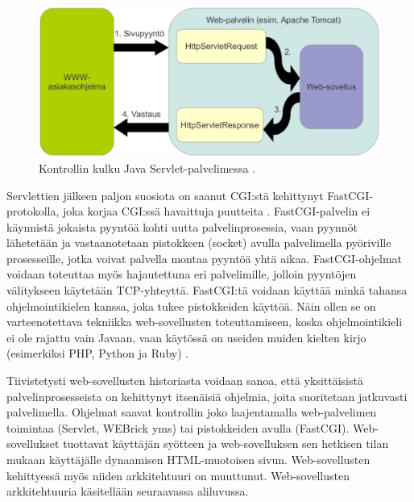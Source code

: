 \begin{figure}[ht]
\centering
\includegraphics[width=\textwidth]{web/servlet.eps}
\caption{Kontrollin kulku Java Servlet-palvelimessa \cite{j2ee}.}%
\label{servlet}
\end{figure}
\pagebreak
Servlettien jälkeen paljon suosiota on saanut CGI:stä kehittynyt FastCGI-protokolla, joka korjaa CGI:ssä havaittuja puutteita \cite{fastcgi}. FastCGI-palvelin ei käynnistä jokaista pyyntöä kohti uutta palvelinprosessia, vaan pyynnöt lähetetään ja vas\-taan\-o\-te\-taan pistokkeen (socket) avulla palvelimella pyöriville prosesseille, jotka voivat palvella montaa pyyntöä yhtä aikaa. FastCGI-ohjelmat voidaan toteuttaa myös hajautettuna eri palvelimille, jolloin pyyntöjen välitykseen käytetään TCP-yhteyttä. FastCGI:tä voidaan käyttää minkä tahansa ohjelmointikielen kanssa, joka tukee pistokkeiden käyttöä. Näin ollen se on varteenotettava tekniikka web-sovellusten toteuttamiseen, koska ohjelmointikieli ei ole rajattu vain Javaan, vaan käytössä on useiden muiden kielten kirjo (esimerkiksi PHP, Python ja Ruby) \cite{fastcgi}.

Tiivistetysti web-sovellusten historiasta voidaan sanoa, että yksittäisistä palvelinprosesseista on kehittynyt itsenäisiä ohjelmia, joita suoritetaan jatkuvasti palvelimella. Ohjelmat saavat kontrollin joko laajentamalla web-pal\-ve\-li\-men toimintaa (Servlet, WEBrick yms) tai pistokkeiden avulla (FastCGI). Web-so\-vel\-luk\-set tuottavat käyttäjän syötteen ja web-sovelluksen sen hetkisen tilan mukaan käyttäjälle dynaamisen HTML-muotoisen sivun. Web-sovellusten kehittyessä myös niiden arkkitehtuuri on muuttunut. Web-sovellusten arkkitehtuuria käsitellään seuraavassa aliluvussa.
